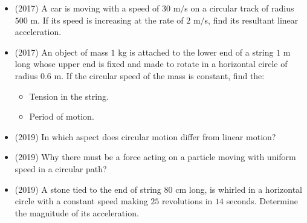 \documentclass{article}
\begin{document}
\begin{itemize}
\begin{itemize}
\end{itemize}
\item (2017)  A car is moving with a speed of $ 30$ m$/$s on a circular track of radius $ 500$ m. If its speed is increasing at the rate of $ 2$ m$/$s, find its resultant linear acceleration.
\item (2017)  An object of mass $ 1$ kg is attached to the lower end of a string $ 1$ m long whose upper end is fixed and made to rotate in a horizontal circle of radius $ 0.6$ m. If the circular speed of the mass is constant, find the:\begin{itemize}
\item Tension in the string. 
\item Period of motion. 
\end{itemize}
\item (2019)  In which aspect does circular motion differ from linear motion? 
\item (2019)  Why there must be a force acting on a particle moving with uniform speed in a circular path? 
\item (2019)  A stone tied to the end of string $ 80$ cm long, is whirled in a horizontal circle with a constant speed making $ 25$ revolutions in $ 14$ seconds. Determine the magnitude of its acceleration. 
\end{itemize}
\end{document}
